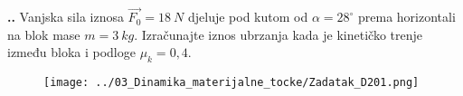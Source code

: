 

\noindent 
\textbf{
\thecjelina.\thezadatak.}
Vanjska sila iznosa $\vec{F_0}=18\ N$ djeluje pod kutom od $\alpha=28 ^\circ$ prema horizontali na blok mase $m=3\ kg$. Izračunajte iznos 
ubrzanja kada je kinetičko trenje između bloka i podloge $\mu_k=0,4$.


\begin{figure}[h]%
  \begin{center}
    \texttt{[image: ../03\_Dinamika\_materijalne\_tocke/Zadatak\_D201.png]}
  \end{center}
\end{figure}
